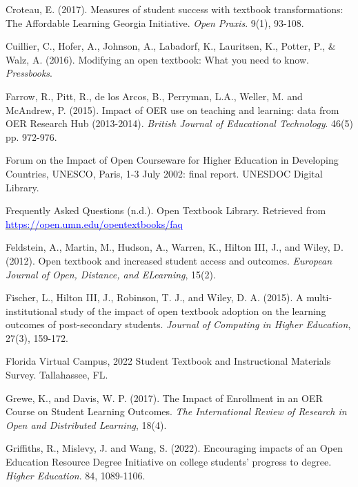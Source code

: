 \documentclass[11pt]{article}
\newcommand{\alink}[2]{\href{#1}{\textcolor{blue}{#2}}}
\begin{document}
\begin{thebibliography}{99}
 Croteau, E. (2017). Measures of student success with textbook transformations: The Affordable Learning Georgia Initiative. {\em Open Praxis}. 9(1), 93-108.

   Cuillier, C., Hofer, A., Johnson, A., Labadorf, K., Lauritsen, K., Potter, P., \& Walz, A. (2016). Modifying an open textbook: What you need to know.  {\em Pressbooks}.%

   Farrow, R., Pitt, R., de los Arcos, B., Perryman, L.A., Weller, M. and McAndrew, P. (2015). Impact of OER use on teaching and learning: data from OER Research Hub (2013-2014). {\em British Journal of Educational Technology}. 46(5) pp. 972-976.

   Forum on the Impact of Open Courseware for Higher Education in Developing Countries, UNESCO, Paris, 1-3 July 2002: final report.  UNESDOC Digital Library.%

   Frequently Asked Questions (n.d.). Open Textbook Library. Retrieved from \alink{https://open.umn.edu/opentextbooks/faq}{https://open.umn.edu/opentextbooks/faq}

   Feldstein, A., Martin, M., Hudson, A., Warren, K., Hilton III, J., and Wiley, D. (2012). Open textbook and increased student access and outcomes. {\em European Journal of Open, Distance, and ELearning}, 15(2).

   Fischer, L., Hilton III, J., Robinson, T. J., and Wiley, D.
  A. (2015). A multi-institutional study of the impact of open textbook adoption on the learning outcomes of post-secondary students. {\em Journal of Computing in Higher Education}, 27(3), 159-172.

   Florida Virtual Campus, 2022 Student Textbook and Instructional Materials Survey. Tallahassee, FL. %

   Grewe, K., and Davis, W. P. (2017). The Impact of Enrollment in an OER Course on Student Learning Outcomes. {\em The International Review of Research in Open and Distributed Learning}, 18(4).

   Griffiths, R., Mislevy, J. and Wang, S. (2022). Encouraging impacts of an Open Education Resource Degree Initiative on college students’ progress to degree. {\em Higher Education}. 84, 1089-1106.


\end{thebibliography}
\end{document}
